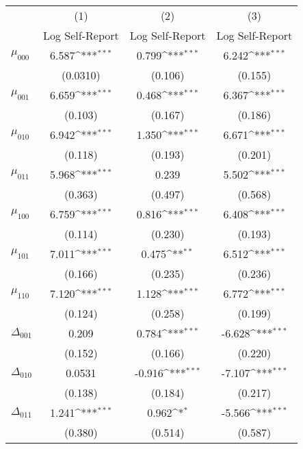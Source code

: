 {
\def\sym#1{\ifmmode^{#1}\else\(^{#1}\)\fi}
\begin{tabular}{l*{3}{c}}
\hline\hline
          &\multicolumn{1}{c}{(1)}&\multicolumn{1}{c}{(2)}&\multicolumn{1}{c}{(3)}\\
          &\multicolumn{1}{c}{Log Self-Report}&\multicolumn{1}{c}{Log Self-Report}&\multicolumn{1}{c}{Log Self-Report}\\
\hline
$\mu_{000}$&    6.587\sym{***}&    0.799\sym{***}&    6.242\sym{***}\\
          & (0.0310)         &  (0.106)         &  (0.155)         \\
$\mu_{001}$&    6.659\sym{***}&    0.468\sym{***}&    6.367\sym{***}\\
          &  (0.103)         &  (0.167)         &  (0.186)         \\
$\mu_{010}$&    6.942\sym{***}&    1.350\sym{***}&    6.671\sym{***}\\
          &  (0.118)         &  (0.193)         &  (0.201)         \\
$\mu_{011}$&    5.968\sym{***}&    0.239         &    5.502\sym{***}\\
          &  (0.363)         &  (0.497)         &  (0.568)         \\
$\mu_{100}$&    6.759\sym{***}&    0.816\sym{***}&    6.408\sym{***}\\
          &  (0.114)         &  (0.230)         &  (0.193)         \\
$\mu_{101}$&    7.011\sym{***}&    0.475\sym{**} &    6.512\sym{***}\\
          &  (0.166)         &  (0.235)         &  (0.236)         \\
$\mu_{110}$&    7.120\sym{***}&    1.128\sym{***}&    6.772\sym{***}\\
          &  (0.124)         &  (0.258)         &  (0.199)         \\
$\Delta_{001}$&    0.209         &    0.784\sym{***}&   -6.628\sym{***}\\
          &  (0.152)         &  (0.166)         &  (0.220)         \\
$\Delta_{010}$&   0.0531         &   -0.916\sym{***}&   -7.107\sym{***}\\
          &  (0.138)         &  (0.184)         &  (0.217)         \\
$\Delta_{011}$&    1.241\sym{***}&    0.962\sym{*}  &   -5.566\sym{***}\\
          &  (0.380)         &  (0.514)         &  (0.587)         \\

\end{tabular}}
